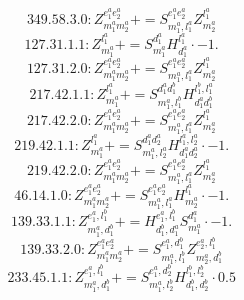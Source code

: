 \documentclass[letterpaper,10pt,fleqn,leqno,onecolumn]{article}
\begin{document}
\begin{equation} \;\;\;\;\;\;  349.58.3.0: Z^{e_{1}^{a}e_{2}^{a}}_{m_{1}^{a}m_{2}^{a}}+=S^{e_{1}^{a}e_{2}^{a}}_{m_{1}^{a},l_{1}^{a}}Z^{l_{1}^{a}}_{m_{2}^{a}} \end{equation}
\begin{equation} \;\;\;\;\;\;  127.31.1.1: Z^{l_{1}^{a}}_{m_{1}^{a}}+=S^{d_{1}^{a}}_{m_{1}^{a}}H^{l_{1}^{a}}_{d_{1}^{a}}\cdot -1. \end{equation}
\begin{equation} \;\;\;\;\;\;  127.31.2.0: Z^{e_{1}^{a}e_{2}^{a}}_{m_{1}^{a}m_{2}^{a}}+=S^{e_{1}^{a}e_{2}^{a}}_{m_{1}^{a},l_{1}^{a}}Z^{l_{1}^{a}}_{m_{2}^{a}} \end{equation}
\begin{equation} \;\;\;\;\;\;  217.42.1.1: Z^{l_{1}^{a}}_{m_{1}^{a}}+=S^{d_{1}^{a}d_{1}^{b}}_{m_{1}^{a},l_{1}^{b}}H^{l_{1}^{b},l_{1}^{a}}_{d_{1}^{a}d_{1}^{b}} \end{equation}
\begin{equation} \;\;\;\;\;\;  217.42.2.0: Z^{e_{1}^{a}e_{2}^{a}}_{m_{1}^{a}m_{2}^{a}}+=S^{e_{1}^{a}e_{2}^{a}}_{m_{1}^{a},l_{1}^{a}}Z^{l_{1}^{a}}_{m_{2}^{a}} \end{equation}
\begin{equation} \;\;\;\;\;\;  219.42.1.1: Z^{l_{1}^{a}}_{m_{1}^{a}}+=S^{d_{1}^{a}d_{2}^{a}}_{m_{1}^{a},l_{2}^{a}}H^{l_{1}^{a},l_{2}^{a}}_{d_{1}^{a}d_{2}^{a}}\cdot -1. \end{equation}
\begin{equation} \;\;\;\;\;\;  219.42.2.0: Z^{e_{1}^{a}e_{2}^{a}}_{m_{1}^{a}m_{2}^{a}}+=S^{e_{1}^{a}e_{2}^{a}}_{m_{1}^{a},l_{1}^{a}}Z^{l_{1}^{a}}_{m_{2}^{a}} \end{equation}
\begin{equation} \;\;\;\;\;\;  46.14.1.0: Z^{e_{1}^{a}e_{2}^{a}}_{m_{1}^{a}m_{2}^{a}}+=S^{e_{1}^{a}e_{2}^{a}}_{m_{1}^{a},l_{1}^{a}}H^{l_{1}^{a}}_{m_{2}^{a}}\cdot -1. \end{equation}
\begin{equation} \;\;\;\;\;\;  139.33.1.1: Z^{e_{1}^{a},l_{1}^{b}}_{m_{1}^{a},d_{1}^{b}}+=H^{e_{1}^{a},l_{1}^{b}}_{d_{1}^{b},d_{1}^{a}}S^{d_{1}^{a}}_{m_{1}^{a}}\cdot -1. \end{equation}
\begin{equation} \;\;\;\;\;\;  139.33.2.0: Z^{e_{1}^{a}e_{2}^{a}}_{m_{1}^{a}m_{2}^{a}}+=S^{e_{1}^{a},d_{1}^{b}}_{m_{1}^{a},l_{1}^{b}}Z^{e_{2}^{a},l_{1}^{b}}_{m_{2}^{a},d_{1}^{b}} \end{equation}
\begin{equation} \;\;\;\;\;\;  233.45.1.1: Z^{e_{1}^{a},l_{1}^{b}}_{m_{1}^{a},d_{1}^{b}}+=S^{e_{1}^{a},d_{2}^{b}}_{m_{1}^{a},l_{2}^{b}}H^{l_{1}^{b},l_{2}^{b}}_{d_{1}^{b},d_{2}^{b}}\cdot 0.5 \end{equation}
\end{document}
